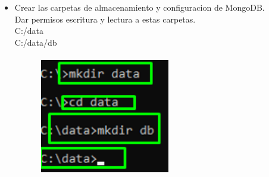 \documentclass[12pt,a4paper,oneside]{book}
\begin{document}
\begin{itemize}
		\item {Crear las carpetas de almacenamiento y configuracion de MongoDB.\\
		Dar permisos escritura y lectura a estas carpetas.\\
		C:/data \\
		C:/data/db \\
		}\\
	
	\includegraphics[width=8cm, height=5cm]{img/5.png}\\
	
\end{itemize}
\end{document}
